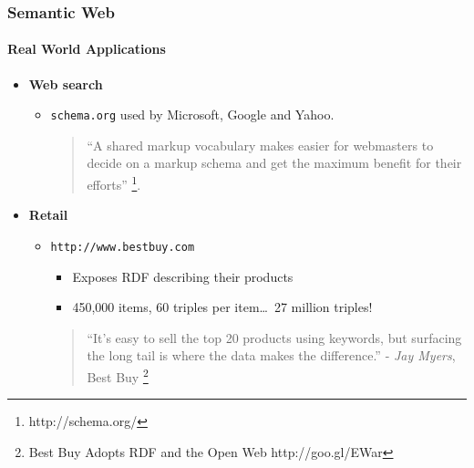 \documentclass{beamer}
\begin{document}
\begin{frame}
\frametitle{Semantic Web}
\framesubtitle{Real World Applications}

\begin{itemize}
\item \textbf{Web search}
  
  \begin{itemize}
  \item \texttt{schema.org} used by Microsoft, Google and Yahoo.

\begin{quotation}
``A shared markup vocabulary makes easier for webmasters to decide on
  a markup schema and get the maximum benefit for their efforts'' \footnote{http://schema.org/}.
\end{quotation}

  \end{itemize}
  
\item \textbf{Retail}
  
\begin{itemize}
\item \texttt{http://www.bestbuy.com}
  
  \begin{itemize}
  \item Exposes RDF describing their products
  \item 450,000 items, 60 triples per item\ldots ~27 million triples!
    

  \end{itemize}

    \begin{quotation}
``It’s easy to sell the top 20 products using keywords, but surfacing
      the long tail is where the data makes the
      difference.'' - \emph{Jay Myers}, Best Buy \footnote{Best Buy Adopts RDF and the Open Web http://goo.gl/EWar}
    \end{quotation}
    
  
  \end{itemize}
\end{itemize}

\end{frame}
\end{document}
